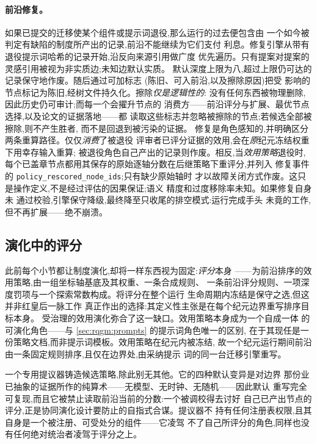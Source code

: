 \paragraph{前沿修复。}
如果已提交的迁移使某个组件或提示词退役,那么运行的过去便包含由
一个如今被判定有缺陷的制度所产出的记录,前沿不能继续为它们支付
利息。修复引擎从带有退役提示词哈希的记录开始,沿反向来源引用做广度
优先遍历。只有提案对提案的灵感引用被视为非实质边;未知边默认实质。
默认深度上限为八,超过上限仍可达的记录保守地作废。随后通过可加标志
(陈旧、可入前沿,以及擦除原因)把受
影响的节点标记为陈旧,经树文件持久化。擦除\emph{仅是逻辑性的}:
没有任何东西被物理删除,因此历史仍可审计;而每一个会擢升节点的
消费方——前沿评分与扩展、最优节点选择,以及论文的证据落地——都
读取这些标志并忽略被擦除的节点;若候选全部被擦除,则不产生胜者,
而不是回退到被污染的证据。
修复是角色感知的,并明确区分两条重算路径。仅仅\emph{消费}了被退役
评审者已评分证据的效用,会在\emph{原}纪元冻结权重下用幸存输入重算;
被退役角色自己产出的记录则作废。相反,当\emph{效用策略}退役时,
每个已盖章节点都用其保存的原始逐轴分数在后继策略下重评分,并列入
修复事件的 \texttt{policy\_rescored\_node\_ids};只有缺少原始轴时
才以故障关闭方式作废。这只是操作定义,不是经过评估的因果保证;语义
精度和过度移除率未知。如果修复自身未
通过校验,引擎保守降级,最终降至只收尾的排空模式:运行完成手头
未竟的工作,但不再扩展——绝不崩溃。

\subsection{演化中的评分}\label{sec:rqgm:utility}

此前每个小节都让制度演化,却将一样东西视为固定:\emph{评分}本身
——为前沿排序的效用策略,由一组坐标轴基底及其权重、一条合成规则、
一条前沿评分规则、一项深度罚项与一个探索常数构成。将评分在整个运行
生命周期内冻结是保守之选,但这并非红皇后一脉工作 \cite{iacob2026red}
真正作出的选择:其定义性主张是在每个纪元边界重写排序目标本身。
受治理的效用演化弥合了这一缺口。效用策略本身成为一个自成一体
的可演化角色——与 \cref{sec:rqgm:prompts} 的提示词角色唯一的区别,
在于其现任是一份策略文档,而非提示词模板。效用策略在纪元内被冻结,
故一个纪元运行期间前沿由一条固定规则排序,且仅在边界处,由采纳提示
词的同一台迁移引擎重写。

一个专用提议器铸造候选策略,除此别无其他。它的四种默认变异是对边界
那份业已抽象的证据所作的纯算术——无模型、无时钟、无随机——因此默认
重写完全可复现,而且它被禁止读取前沿当前的分数:一个被调校得去讨好
自己已产出节点的评分,正是协同演化设计要防止的自指式合谋。提议器不
持有任何注册表权限,且其自身是一个被注册、可受处分的组件——它凌驾
不了自己所评分的角色,同样也没有任何绝对统治者凌驾于评分之上。

